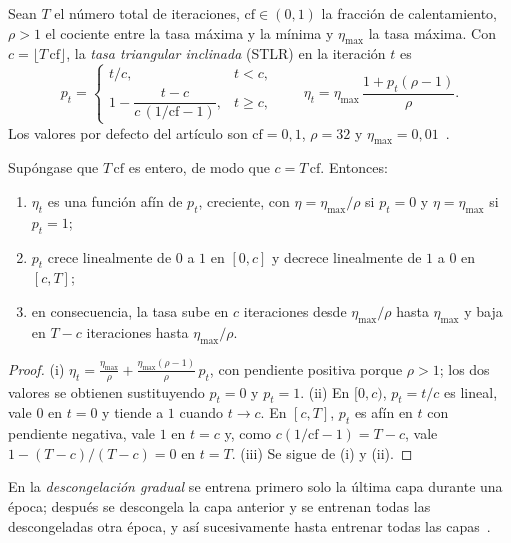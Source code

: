 \begin{definicion}\label{def:stlr}
Sean $T$ el número total de iteraciones, $\mathrm{cf}\in(0,1)$ la fracción de calentamiento, $\rho>1$ el cociente entre la tasa máxima y la mínima y $\eta_{\max}$ la tasa máxima. Con $c=\lfloor T\,\mathrm{cf}\rfloor$, la \emph{tasa triangular inclinada} (STLR) en la iteración $t$ es
\[
p_t=\begin{cases} t/c, & t<c,\\[2pt] 1-\dfrac{t-c}{c\,(1/\mathrm{cf}-1)}, & t\ge c,\end{cases}\qquad
\eta_t=\eta_{\max}\,\frac{1+p_t(\rho-1)}{\rho}.
\]
Los valores por defecto del artículo son $\mathrm{cf}=0{,}1$, $\rho=32$ y $\eta_{\max}=0{,}01$~\cite[§3.2]{howard-ruder}.
\end{definicion}

\begin{proposicion}\label{prop:stlr}
Supóngase que $T\,\mathrm{cf}$ es entero, de modo que $c=T\,\mathrm{cf}$. Entonces:
\begin{enumerate}
  \item $\eta_t$ es una función afín de $p_t$, creciente, con $\eta=\eta_{\max}/\rho$ si $p_t=0$ y $\eta=\eta_{\max}$ si $p_t=1$;
  \item $p_t$ crece linealmente de $0$ a $1$ en $[0,c]$ y decrece linealmente de $1$ a $0$ en $[c,T]$;
  \item en consecuencia, la tasa sube en $c$ iteraciones desde $\eta_{\max}/\rho$ hasta $\eta_{\max}$ y baja en $T-c$ iteraciones hasta $\eta_{\max}/\rho$.
\end{enumerate}
\end{proposicion}

\begin{proof}
(i) $\eta_t=\frac{\eta_{\max}}{\rho}+\frac{\eta_{\max}(\rho-1)}{\rho}\,p_t$, con pendiente positiva porque $\rho>1$; los dos valores se obtienen sustituyendo $p_t=0$ y $p_t=1$. (ii) En $[0,c)$, $p_t=t/c$ es lineal, vale $0$ en $t=0$ y tiende a $1$ cuando $t\to c$. En $[c,T]$, $p_t$ es afín en $t$ con pendiente negativa, vale $1$ en $t=c$ y, como $c(1/\mathrm{cf}-1)=T-c$, vale $1-(T-c)/(T-c)=0$ en $t=T$. (iii) Se sigue de (i) y (ii).
\end{proof}

\begin{definicion}\label{def:descongelacion}
En la \emph{descongelación gradual} se entrena primero solo la última capa durante una época; después se descongela la capa anterior y se entrenan todas las descongeladas otra época, y así sucesivamente hasta entrenar todas las capas~\cite[§3.3]{howard-ruder}.
\end{definicion}


